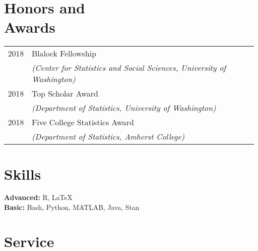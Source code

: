 \documentclass[margin,centered]{res}
\begin{document}
\begin{resume}



\section{\sc Honors and\\ Awards}

\begin{tabular}{@{}p{0.8in}p{4in}}
2018 & Blalock Fellowship \\
&\textit{(Center for Statistics and Social Sciences, University of Washington)}\\
2018 & Top Scholar Award\\
&\textit{(Department of Statistics, University of Washington)}\\
2018 & Five College Statistics Award \\
&\textit{(Department of Statistics, Amherst College)}
\end{tabular}

\section{\sc Skills}
{\bf Advanced:} R, LaTeX\\
{\bf Basic:} Bash, Python, MATLAB, Java, Stan 


\section{\sc Service}


\end{resume}
\end{document}
